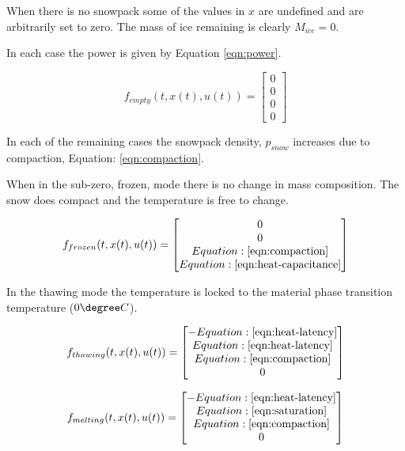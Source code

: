 \documentclass{article}
\begin{document}
When there is no snowpack some of the values in $x$ are undefined
and are arbitrarily set to zero.
The mass of ice remaining is clearly $M_{ice} = 0$.

In each case the power is given by Equation \ref{eqn:power}.

\begin{equation}
f_{empty}(t,x(t),u(t)) =
  \begin{bmatrix} 0 \\ 0 \\ 0 \\ 0 \end{bmatrix}
\end{equation}

In each of the remaining cases the snowpack density, $p_{snow}$
increases due to compaction, Equation: \ref{eqn:compaction}.

When in the sub-zero, frozen, mode  there is no change in mass composition.
The snow does compact and the temperature is free to change.

\begin{equation}
f_{frozen}(t,x(t),u(t)) =
  \begin{bmatrix}
     0 \\ 0 \\
     Equation: \ref{eqn:compaction} \\
     Equation: \ref{eqn:heat-capacitance}
  \end{bmatrix}
\end{equation}

In the thawing mode the temperature is locked to the material
phase transition temperature ($0 \degree C$).

\begin{equation}
f_{thawing}(t,x(t),u(t)) =
  \begin{bmatrix}
     - Equation: \ref{eqn:heat-latency} \\
     Equation: \ref{eqn:heat-latency} \\
     Equation: \ref{eqn:compaction} \\
     0
  \end{bmatrix}
\end{equation}

\begin{equation}
f_{melting}(t,x(t),u(t)) =
  \begin{bmatrix}
     - Equation: \ref{eqn:heat-latency} \\
     Equation: \ref{eqn:saturation} \\
     Equation: \ref{eqn:compaction} \\
     0
  \end{bmatrix}
\end{equation}
\end{document}
